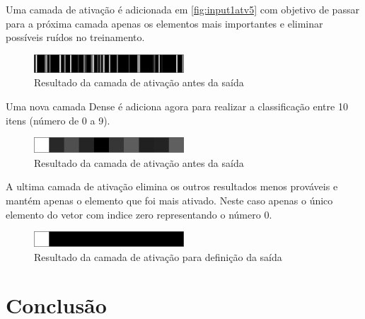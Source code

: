 \documentclass[
	12pt,				%
	oneside,			%
	a4paper,			%
	english,			%
	french,				%
	spanish,			%
	brazil,				%
	]{abntex2}
\begin{document}
\par Uma camada de ativação é adicionada em \autoref{fig:input1atv5} com objetivo de passar para a próxima camada apenas os elementos mais importantes e eliminar possíveis ruídos no treinamento.
\begin{center}
\begin{figure}[H]
	\centering
	\includegraphics[width=0.5\textwidth]{images/fabio/resultados/network_1/input_1_layer_activation_7}
	\caption{Resultado da camada de ativação antes da saída}
	\label{fig:input1atv5}
\end{figure}
\end{center}
\par Uma nova camada Dense é adiciona agora para realizar a classificação entre 10 itens (número de 0 a 9).
\begin{center}
\begin{figure}[H]
	\centering
	\includegraphics[width=0.5\textwidth]{images/fabio/resultados/network_1/input_1_layer_dense_2}
	\caption{Resultado da camada de ativação antes da saída}
	\label{fig:input1dense2}
\end{figure}
\end{center}
\par A ultima camada de ativação elimina os outros resultados menos prováveis e mantém apenas o elemento que foi mais ativado. Neste caso apenas o único elemento do vetor com indice zero representando o número 0.
\begin{center}
\begin{figure}[H]
	\centering
	\includegraphics[width=0.5\textwidth]{images/fabio/resultados/network_1/input_1_layer_activation_8}
	\caption{Resultado da camada de ativação para definição da saída}
	\label{fig:input1atv7}
\end{figure}
\end{center}
\chapter{Conclusão}
\end{document}
